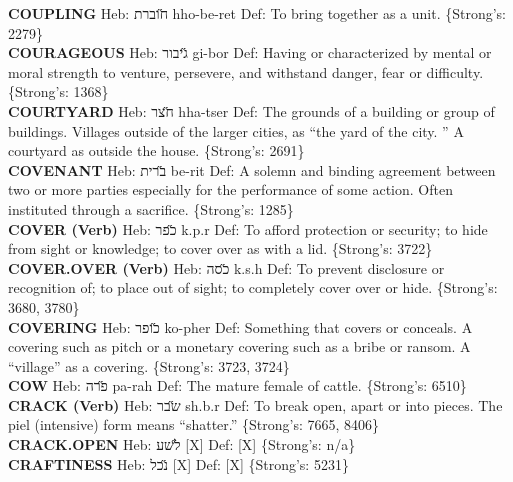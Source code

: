 {\textbf{COUPLING} Heb: {\large\H חוברת} hho-be-ret Def: To bring together as a unit. \{Strong's: 2279\}\hfill{}\\

\textbf{COURAGEOUS} Heb: {\large\H גיבור} gi-bor Def: Having or characterized by mental or moral strength to venture, persevere, and withstand danger, fear or difficulty. \{Strong's: 1368\}\hfill{}\\

\textbf{COURTYARD} Heb: {\large\H חצר} hha-tser Def: The grounds of a building or group of buildings. Villages outside of the larger cities, as ``the yard of the city. '' A courtyard as outside the house. \{Strong's: 2691\}\hfill{}\\

\textbf{COVENANT} Heb: {\large\H ברית} be-rit Def: A solemn and binding agreement between two or more parties especially for the performance of some action. Often instituted through a sacrifice. \{Strong's: 1285\}\hfill{}\\

\textbf{COVER (Verb)} Heb: {\large\H כפר} k.p.r Def: To afford protection or security; to hide from sight or knowledge; to cover over as with a lid. \{Strong's: 3722\}\hfill{}\\

\textbf{COVER.OVER (Verb)} Heb: {\large\H כסה} k.s.h Def: To prevent disclosure or recognition of; to place out of sight; to completely cover over or hide. \{Strong's: 3680, 3780\}\hfill{}\\

\textbf{COVERING} Heb: {\large\H כופר} ko-pher Def: Something that covers or conceals. A covering such as pitch or a monetary covering such as a bribe or ransom. A ``village'' as a covering. \{Strong's: 3723, 3724\}\hfill{}\\

\textbf{COW} Heb: {\large\H פרה} pa-rah Def: The mature female of cattle. \{Strong's: 6510\}\hfill{}\\

\textbf{CRACK (Verb)} Heb: {\large\H שבר} sh.b.r Def: To break open, apart or into pieces. The piel (intensive) form means ``shatter.'' \{Strong's: 7665, 8406\}\hfill{}\\

\textbf{CRACK.OPEN} Heb: {\large\H לשע} {[}X{]} Def: {[}X{]} \{Strong's: n/a\}\hfill{}\\

\textbf{CRAFTINESS} Heb: {\large\H נכל} {[}X{]} Def: {[}X{]} \{Strong's: 5231\}\hfill{}\\

}
